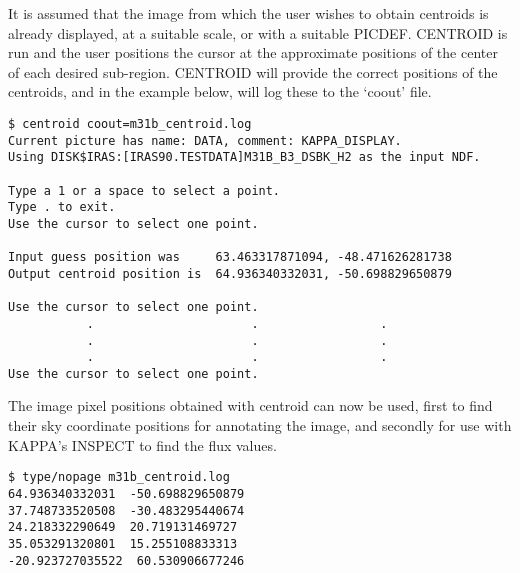 \documentclass[twoside,11pt]{article}
\begin{document}
It is assumed that the image from which the user wishes to obtain centroids is
already displayed, at a suitable scale, or with a suitable PICDEF. CENTROID is
run and the user positions the cursor at the approximate positions of
the center of each desired sub-region. CENTROID will provide the correct
positions of the centroids, and in the example below, will log these to the
`coout' file.
\begin{small}
\begin{verbatim}
$ centroid coout=m31b_centroid.log
Current picture has name: DATA, comment: KAPPA_DISPLAY.
Using DISK$IRAS:[IRAS90.TESTDATA]M31B_B3_DSBK_H2 as the input NDF.

Type a 1 or a space to select a point.
Type . to exit.
Use the cursor to select one point.

Input guess position was     63.463317871094, -48.471626281738
Output centroid position is  64.936340332031, -50.698829650879

Use the cursor to select one point.
           .                      .                 .
           .                      .                 .
           .                      .                 .
Use the cursor to select one point.
\end{verbatim}
\end{small}

The image pixel positions obtained with centroid can now be used, first to
find their sky coordinate positions for annotating the image, and secondly
for use with KAPPA's INSPECT to find the flux values.
\begin{small}
\begin{verbatim}
$ type/nopage m31b_centroid.log
64.936340332031  -50.698829650879  
37.748733520508  -30.483295440674  
24.218332290649  20.719131469727  
35.053291320801  15.255108833313  
-20.923727035522  60.530906677246  
\end{verbatim}
\end{small}
\end{document}
